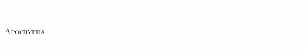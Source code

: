 \fancyhead[RE,LO]{}
\fancyhead[LE,RO]{}
\onecolumn
\vspace*{50ex}
\begin{center}
	\rule{15em}{.25mm}\\
	\vspace{1.5ex}
	{\Large{\scshape Apocrypha}}
	\par
	\rule{15em}{.25mm}
\end{center}
\vfill
\twocolumn